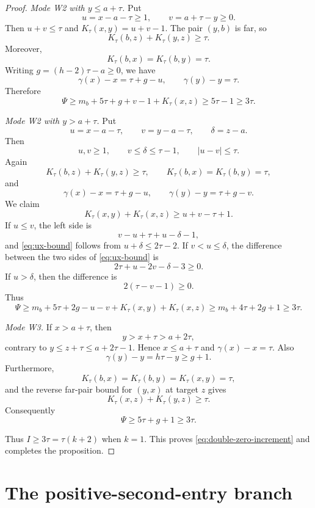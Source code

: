 \documentclass[11pt]{article}
\theoremstyle{definition}
\theoremstyle{remark}
\begin{document}
\begin{proof}
\smallskip
\noindent\emph{Mode W2 with $y\le a+\tau$.}
Put
\[
 u=x-a-\tau\ge1,
 \qquad
 v=a+\tau-y\ge0.
\]
Then $u+v\le\tau$ and
$K_\tau(x,y)=u+v-1$.  The pair $(y,b)$ is far, so
\[
 K_\tau(b,z)+K_\tau(y,z)\ge\tau.
\]
Moreover,
\[
 K_\tau(b,x)=K_\tau(b,y)=\tau.
\]
Writing $g=(h-2)\tau-a\ge0$, we have
\[
 \gamma(x)-x=\tau+g-u,
 \qquad
 \gamma(y)-y=\tau.
\]
Therefore
\[
 \Psi\ge m_b+5\tau+g+v-1+K_\tau(x,z)
 \ge5\tau-1\ge3\tau.
\]

\smallskip
\noindent\emph{Mode W2 with $y>a+\tau$.}
Put
\[
 u=x-a-\tau,
 \qquad
 v=y-a-\tau,
 \qquad
 \delta=z-a.
\]
Then
\[
 u,v\ge1,
 \qquad
 v\le\delta\le\tau-1,
 \qquad
 |u-v|\le\tau.
\]
Again
\[
 K_\tau(b,z)+K_\tau(y,z)\ge\tau,
 \qquad
 K_\tau(b,x)=K_\tau(b,y)=\tau,
\]
and
\[
 \gamma(x)-x=\tau+g-u,
 \qquad
 \gamma(y)-y=\tau+g-v.
\]
We claim
\begin{equation}
 K_\tau(x,y)+K_\tau(x,z)\ge u+v-\tau+1.
 \label{eq:ux-bound}
\end{equation}
If $u\le v$, the left side is
\[
 v-u+\tau+u-\delta-1,
\]
and \eqref{eq:ux-bound} follows from $u+\delta\le2\tau-2$.
If $v<u\le\delta$, the difference between the two sides of
\eqref{eq:ux-bound} is
\[
 2\tau+u-2v-\delta-3\ge0.
\]
If $u>\delta$, then the difference is
\[
 2(\tau-v-1)\ge0.
\]
Thus
\[
 \Psi\ge m_b+5\tau+2g-u-v+K_\tau(x,y)+K_\tau(x,z)
 \ge m_b+4\tau+2g+1\ge3\tau.
\]

\smallskip
\noindent\emph{Mode W3.}
If $x>a+\tau$, then
\[
 y>x+\tau>a+2\tau,
\]
contrary to $y\le z+\tau\le a+2\tau-1$.  Hence $x\le a+\tau$ and
$\gamma(x)-x=\tau$.  Also
\[
 \gamma(y)-y=h\tau-y\ge g+1.
\]
Furthermore,
\[
 K_\tau(b,x)=K_\tau(b,y)=K_\tau(x,y)=\tau,
\]
and the reverse far-pair bound for $(y,x)$ at target $z$ gives
\[
 K_\tau(x,z)+K_\tau(y,z)\ge\tau.
\]
Consequently
\[
 \Psi\ge5\tau+g+1\ge3\tau.
\]

Thus $I\ge3\tau=\tau(k+2)$ when $k=1$.  This proves
\eqref{eq:double-zero-increment} and completes the proposition.
\end{proof}

\section{The positive-second-entry branch}
\end{document}
